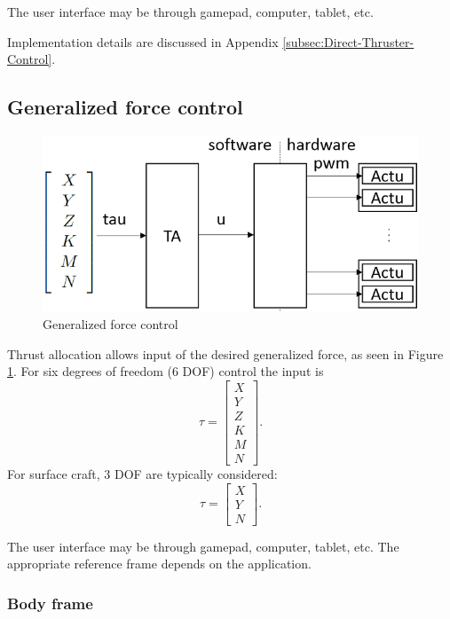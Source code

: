 \documentclass[a4paper,twoside,english]{report}
\begin{document}
The user interface may be through gamepad, computer, tablet, etc.

Implementation details are discussed in Appendix \ref{subsec:Direct-Thruster-Control}.

\subsection{Generalized force control}

\begin{figure}
\centering \includegraphics[scale=0.45]{fig/ctrl_tau} \caption{\label{fig: Generalized force control}Generalized force control}
\end{figure}

Thrust allocation allows input of the desired generalized force, as
seen in Figure \ref{fig: Generalized force control}. For six degrees
of freedom (6 DOF) control the input is 
\[
\tau=\left[\begin{array}{c}
X\\
Y\\
Z\\
K\\
M\\
N
\end{array}\right].
\]
For surface craft, 3 DOF are typically considered: 
\[
\tau=\left[\begin{array}{c}
X\\
Y\\
N
\end{array}\right].
\]

The user interface may be through gamepad, computer, tablet, etc.
The appropriate reference frame depends on the application.

\subsubsection{Body frame}
\end{document}
